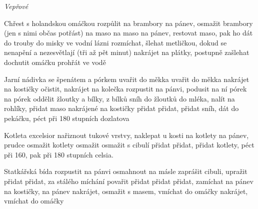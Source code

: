 \documentclass[12pt,a4paper]{article}
\begin{document}
\vspace*{\fill}
\hfill {\Huge\it Vepřové}\hfill
\vspace*{\fill}
\newpage

\begin{recipe}{Chřest s holandskou omáčkou}
   rozpůlit
   na brambory
   na pánev, osmažit brambory (jen s nimi občas potřást)
   na maso
   na maso
   na pánev, restovat maso, pak ho dát do trouby
   do misky ve vodní lázni
   rozmíchat, šlehat metličkou, dokud se nenapění a nezesvětlají (tři až pět minut)
   nakrájet na plátky, postupně zašlehat
   dochutit omáčku
   prohřát ve vodě
\end{recipe}
\newpage

\begin{recipe}{Jarní nádivka se špenátem a pórkem}
   uvařit do měkka
   uvařit do měkka
   nakrájet na kostičky
   očistit, nakrájet na kolečka
   rozpustit na pánvi, podusit na ní pórek
   na pórek
   oddělit žloutky a bílky, z bílků sníh
   do žloutků
   do mléka, nalít na rohlíky, přidat maso nakrájené na kostičky
   přidat
   přidat, přidat sníh, dát do pekáčku, péct při 180 stupních dozlatova
\end{recipe}
\newpage

\begin{recipe}{Kotleta excelsior}
   nařiznout tukové vrstvy, naklepat u kosti
   na kotlety
   na pánev, prudce osmažit kotlety
   osmažit
   osmažit s cibulí
   přidat
   přidat, přidat kotlety, péct při 160, pak při 180 stupních celsia.
\end{recipe}
\newpage

\begin{recipe}{Statkářská bída}
   rozpustit na pánvi
   osmahnout na másle
   zaprášit cibuli, upražit
   přidat
   přidat, za stálého míchání povařit
   přidat
   přidat
   přidat, zamíchat
   na pánev
   na kostičky, na pánev
   nakrájet, osmažit s masem, vmíchat do omáčky
   nakrájet, vmíchat do omáčky
\end{recipe}
\newpage
\end{document}
